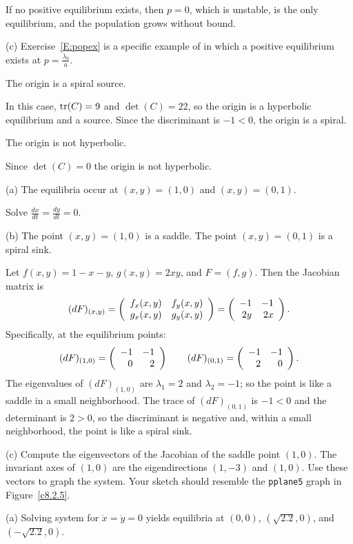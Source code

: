 \documentclass{ximera}
\begin{document}
\para If no positive equilibrium exists, then $p = 0$, which is unstable,
is the only equilibrium, and the population grows without bound.

(c) Exercise~\ref{E:popex} is a specific example of  in
which a positive equilibrium exists at $p = \frac{\lambda_0}{a}$.

 \ans The origin is a spiral source.

\soln In this case, ${\rm tr}(C) = 9$ and $\det(C) = 22$, so the origin
is a hyperbolic equilibrium and a source.  Since the discriminant is 
$-1<0$, the origin is a spiral.

 \ans The origin is not hyperbolic.

\soln Since $\det(C) = 0$ the origin is not hyperbolic.

(a) \ans The equilibria occur at $(x,y) = (1,0)$ and $(x,y) = (0,1)$.

\soln Solve $\frac{dx}{dt} = \frac{dy}{dt} = 0$.

(b) \ans The point $(x,y) = (1,0)$ is a saddle.  The point $(x,y) = (0,1)$
is a spiral sink.

\soln Let $f(x,y) = 1 - x - y$, $g(x,y) = 2xy$,
and $F = (f,g)$.  Then the Jacobian matrix is
\[
(dF)_{(x,y)} = \left(\begin{array}{rr} f_x(x,y) & f_y(x,y)\\ g_x(x,y) &g_y(x,y)\end{array}\right)
= \left(\begin{array}{rr} -1 & -1\\ 2y &2x\end{array}\right).
\]
Specifically, at the equilibrium points:
\[
(dF)_{(1,0)} = \left(\begin{array}{rr} -1 & -1\\ 0 &2\end{array}\right) \qquad
(dF)_{(0,1)} = \left(\begin{array}{rr} -1 & -1\\ 2 &0\end{array}\right).
\]
The eigenvalues of $(dF)_{(1,0)}$ are $\lambda_1 = 2$ and $\lambda_2 = -1$;
so the point is like a saddle in a small neighborhood.  The trace of
$(dF)_{(0,1)}$ is $-1 < 0$ and the determinant is $2 > 0$, so the
discriminant is negative and, within a small neighborhood, the point
is like a spiral sink.

(c) Compute the eigenvectors of the Jacobian of the saddle point $(1,0)$.
The invariant axes of $(1,0)$ are the eigendirections $(1,-3)$ and
$(1,0)$.  Use these vectors to graph the system.  Your sketch should
resemble the {\tt pplane5} graph in Figure~\ref{c8.2.5}.

\begin{figure}[htb]
                       \centerline{%
                       }
\end{figure}

(a) Solving system  for $\dot{x} = \dot{y} = 0$
yields equilibria at $(0,0)$, $(\sqrt{2.2},0)$, and $(-\sqrt{2.2},0)$.
\end{document}
